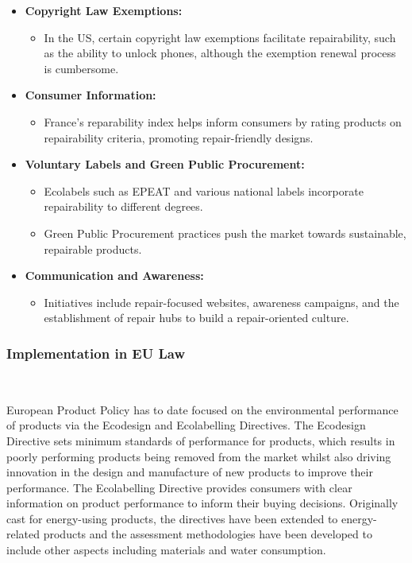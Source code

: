 \begin{itemize}
    \item \textbf{Copyright Law Exemptions:}
          \begin{itemize}
              \item In the US, certain copyright law exemptions facilitate repairability, such as
                    the ability to unlock phones, although the exemption renewal process is
                    cumbersome.
          \end{itemize}

    \item \textbf{Consumer Information:}
          \begin{itemize}
              \item France's reparability index helps inform consumers by rating products on
                    repairability criteria, promoting repair-friendly designs.
          \end{itemize}

    \item \textbf{Voluntary Labels and Green Public Procurement:}
          \begin{itemize}
              \item Ecolabels such as EPEAT and various national labels incorporate repairability
                    to different degrees.
              \item Green Public Procurement practices push the market towards sustainable,
                    repairable products.
          \end{itemize}

    \item \textbf{Communication and Awareness:}
          \begin{itemize}
              \item Initiatives include repair-focused websites, awareness campaigns, and the
                    establishment of repair hubs to build a repair-oriented culture.
          \end{itemize}
\end{itemize}

\subsubsection{Implementation in EU Law}~\cite{eu2023repair, moeslinger2022repair}

European Product Policy has to date focused on the environmental performance of
products via the Ecodesign and Ecolabelling Directives. The Ecodesign Directive
sets minimum standards of performance for products, which results in poorly
performing products being removed from the market whilst also driving
innovation in the design and manufacture of new products to improve their
performance. The Ecolabelling Directive provides consumers with clear
information on product performance to inform their buying decisions. Originally
cast for energy-using products, the directives have been extended to
energy-related products and the assessment methodologies have been developed to
include other aspects including materials and water consumption.

